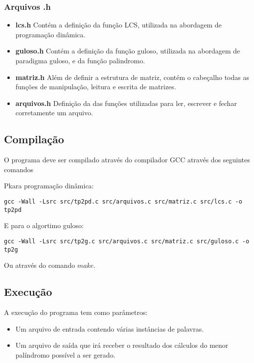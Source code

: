 \documentclass[12pt]{article}
\begin{document}
\subsubsection{Arquivos .h}

\begin{itemize}
\item \textbf{lcs.h} Contém a definição da função LCS, utilizada na abordagem de programação dinâmica.
\item \textbf{guloso.h} Contém a definição da função guloso, utilizada na abordagem de paradigma guloso, e da função palindromo.
\item \textbf{matriz.h} Além de definir a estrutura de matriz, contém o cabeçalho todas as funções de manipulação, leitura e escrita de matrizes.
\item \textbf{arquivos.h} Definição da das funções utilizadas para ler, escrever e fechar corretamente um arquivo.
\end{itemize}

\subsection{Compilação}

O programa deve ser compilado através do compilador GCC através dos seguintes comandos

Pkara programação dinâmica:
\begin{footnotesize}
\begin{verbatim}
gcc -Wall -Lsrc src/tp2pd.c src/arquivos.c src/matriz.c src/lcs.c -o tp2pd \end{verbatim}
\end{footnotesize}

E para o algortimo guloso:
\begin{footnotesize}
\begin{verbatim}
gcc -Wall -Lsrc src/tp2g.c src/arquivos.c src/matriz.c src/guloso.c -o tp2g \end{verbatim}
\end{footnotesize}

Ou através do comando $make$.

\subsection{Execução}

A execução do programa tem como parâmetros:
\begin{itemize}
\item Um arquivo de entrada contendo várias instâncias de palavras.
\item Um arquivo de saída que irá receber o resultado dos cálculos do menor palíndromo possível a ser gerado.
\end{itemize}
\end{document}
